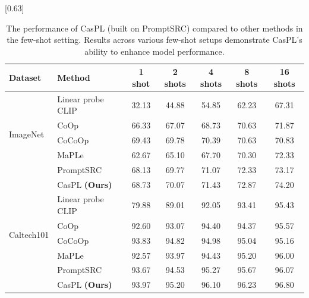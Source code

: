 \begin{table}[t!]
    \small \centering
    \setlength{\tabcolsep}{15pt}
    \caption{The performance of CasPL (built on PromptSRC) compared to other methods in the few-shot setting. Results across various few-shot setups demonstrate CasPL's ability to enhance model performance.}
    \scalebox{0.63}[0.63]{
        \begin{tabular}{ll|ccccc}
        \hline
        Dataset & 
        Method & 
        1 shot &
        2 shots & 
        4 shots & 
        8 shots &
        16 shots \\  
        \hline
        \multirow{5}{*}{ImageNet}      & Linear probe CLIP      &32.13	&44.88&	54.85	&62.23	&67.31\\ 
                                       & CoOp                   &66.33	&67.07	&68.73	&70.63&	71.87\\ 
                                       & CoCoOp                  & 69.43	&69.78	&70.39&	70.63&	70.83\\
                                       & MaPLe                  & 62.67	&65.10	&67.70&	70.30&	72.33\\
                                       & PromptSRC             & 68.13	&69.77	&71.07	&72.33	&73.17\\
                                       \rowcolor{tablecolor}
                                       & CasPL \textbf{(Ours) }     &68.73   &70.07   &71.43    &72.87   & 74.20    \\
        \hline
        \multirow{5}{*}{Caltech101}    & Linear probe CLIP      & 79.88	&89.01	&92.05	&93.41	&95.43\\
                                       & CoOp                    & 92.60	&93.07	&94.40	&94.37	&95.57\\
                                       & CoCoOp                  & 93.83	&94.82	&94.98	&95.04	&95.16\\
                                       & MaPLe                  & 92.57	&93.97	&94.43&	95.20&	96.00\\
                                       &  PromptSRC              &93.67	&94.53	&95.27	&95.67	&96.07\\
                                       \rowcolor{tablecolor}
                                       & CasPL \textbf{(Ours) }    &93.97 	&95.20 	&96.10 	&96.23 	&96.80   \\

\end{tabular}}
\end{table}
